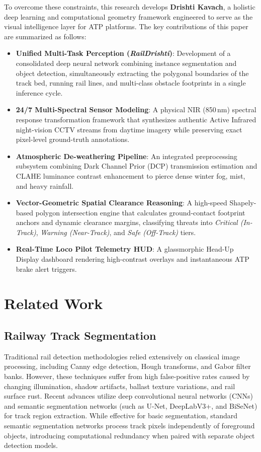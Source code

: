 \documentclass[conference]{IEEEtran}
\begin{document}
To overcome these constraints, this research develops \textbf{Drishti Kavach}, a holistic deep learning and computational geometry framework engineered to serve as the visual intelligence layer for ATP platforms. The key contributions of this paper are summarized as follows:
\begin{itemize}
    \item \textbf{Unified Multi-Task Perception (\textit{RailDrishti})}: Development of a consolidated deep neural network combining instance segmentation and object detection, simultaneously extracting the polygonal boundaries of the track bed, running rail lines, and multi-class obstacle footprints in a single inference cycle.
    \item \textbf{24/7 Multi-Spectral Sensor Modeling}: A physical NIR (850\,nm) spectral response transformation framework that synthesizes authentic Active Infrared night-vision CCTV streams from daytime imagery while preserving exact pixel-level ground-truth annotations.
    \item \textbf{Atmospheric De-weathering Pipeline}: An integrated preprocessing subsystem combining Dark Channel Prior (DCP) transmission estimation and CLAHE luminance contrast enhancement to pierce dense winter fog, mist, and heavy rainfall.
    \item \textbf{Vector-Geometric Spatial Clearance Reasoning}: A high-speed Shapely-based polygon intersection engine that calculates ground-contact footprint anchors and dynamic clearance margins, classifying threats into \textit{Critical (In-Track)}, \textit{Warning (Near-Track)}, and \textit{Safe (Off-Track)} tiers.
    \item \textbf{Real-Time Loco Pilot Telemetry HUD}: A glassmorphic Head-Up Display dashboard rendering high-contrast overlays and instantaneous ATP brake alert triggers.
\end{itemize}

\section{Related Work}

\subsection{Railway Track Segmentation}
Traditional rail detection methodologies relied extensively on classical image processing, including Canny edge detection, Hough transforms, and Gabor filter banks. However, these techniques suffer from high false-positive rates caused by changing illumination, shadow artifacts, ballast texture variations, and rail surface rust. Recent advances utilize deep convolutional neural networks (CNNs) and semantic segmentation networks (such as U-Net, DeepLabV3+, and BiSeNet) for track region extraction. While effective for basic segmentation, standard semantic segmentation networks process track pixels independently of foreground objects, introducing computational redundancy when paired with separate object detection models.
\end{document}
